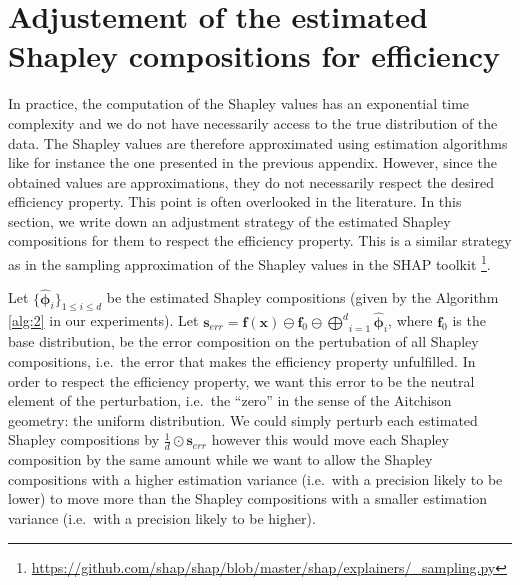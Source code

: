 \documentclass{article}
\theoremstyle{plain}
\theoremstyle{definition}
\theoremstyle{remark}
\begin{document}
\newpage
\section{Adjustement of the estimated Shapley compositions for efficiency}
\label{app:correct}

In practice, the computation of the Shapley values has an exponential time complexity and we do not have necessarily access to the true distribution of the data. The Shapley values are therefore approximated using estimation algorithms like for instance the one presented in the previous appendix. However, since the obtained values are approximations, they do not necessarily respect the desired efficiency property. This point is often overlooked in the literature. In this section, we write down an adjustment strategy of the estimated Shapley compositions for them to respect the efficiency property. This is a similar strategy as in the sampling approximation of the Shapley values in the SHAP toolkit \cite{NIPS2017_7062}\footnote{\url{https://github.com/shap/shap/blob/master/shap/explainers/_sampling.py}}.

Let $\{\hat{\bm{\phi}}_i\}_{1\leq i \leq d}$ be the estimated Shapley compositions (given by the Algorithm \ref{alg:2} in our experiments). Let $\displaystyle \bm{s}_{err} = \bm{f}(\bm{x}) \ominus \bm{f}_0 \ominus \underset{i=1}{\overset{d}\bigoplus} \hat{\bm{\phi}}_i$, where $\bm{f}_0$ is the base distribution, be the error composition on the pertubation of all Shapley compositions, i.e.~the error that makes the efficiency property unfulfilled. In order to respect the efficiency property, we want this error to be the neutral element of the perturbation, i.e.~the ``zero'' in the sense of the Aitchison geometry: the uniform distribution. We could simply perturb each estimated Shapley compositions by $\frac{1}{d}\odot\bm{s}_{err}$ however this would move each Shapley composition by the same amount while we want to allow the Shapley compositions with a higher estimation variance (i.e.~with a precision likely to be lower) to move more than the Shapley compositions with a smaller estimation variance (i.e.~with a precision likely to be higher).
\end{document}
